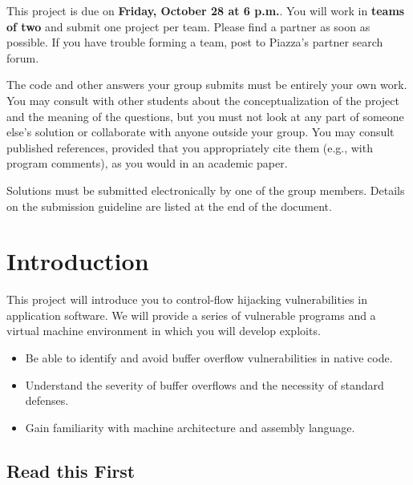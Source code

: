 \documentclass[letterpaper,12pt]{report}
\newcommand{\htitle}
{
     \noindent\parbox{\textwidth}
    {
        \course\hfill \distdate\newline
        \coursename\hfill 
        \settitle \vspace*{-.5ex}\newline
        \mbox{}\hrulefill\mbox{}
    }
    \vspace{8pt}
    \begin{center}{\Large\bf{\settitle}}\end{center}
}
\newcommand{\handout}
{
    \thispagestyle{empty}
    \markboth{}{}
    \pagestyle{plain}
    \htitle
}
\newcommand{\problemsetheader}
{
\setlength{\parindent}{0pt}

\medskip

This project is due on {\bf Friday, October 28 at 6 p.m.}. You will work in {\bf
teams of two} and submit one project per team. Please find a partner as soon as
possible. If you have trouble forming a team, post to Piazza's partner search forum.

\medskip

The code and other answers your group submits must be entirely your own work.
You may consult with other students about the conceptualization of the project
and the meaning of the questions, but you must not look at any part of someone
else's solution or collaborate with anyone outside your group. You may consult
published references, provided that you appropriately cite them (e.g., with
program comments), as you would in an academic paper.

\medskip

Solutions must be submitted electronically by one of the group members. Details
on the submission guideline are listed at the end of the document.

\medskip

\hrulefill
}
\begin{document}
\handout
\problemsetheader

\medskip


\section*{Introduction}

This project will introduce you to control-flow hijacking vulnerabilities in
application software. We will provide a series of vulnerable programs and a
virtual machine environment in which you will develop exploits.

\begin{itemize}
\item Be able to identify and avoid buffer overflow vulnerabilities in native code.
\item Understand the severity of buffer overflows and the necessity of standard defenses.
\item Gain familiarity with machine architecture and assembly language.
\end{itemize}

\subsection*{Read this First}
\end{document}
